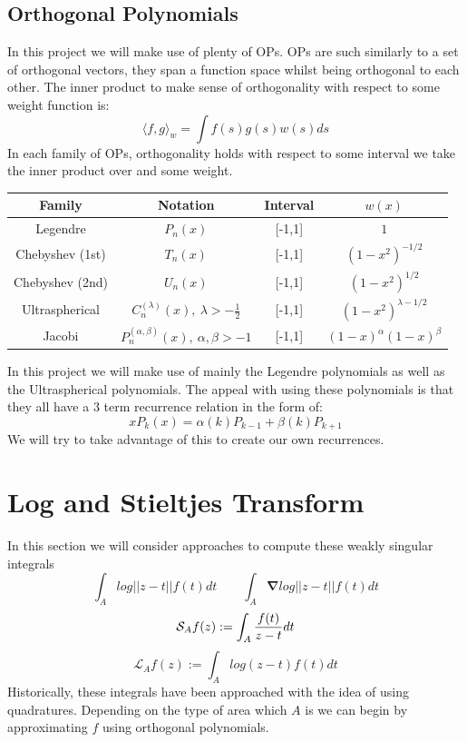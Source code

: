\documentclass{article}
\begin{document}
\subsection{Orthogonal Polynomials}
In this project we will make use of plenty of OPs.
OPs are such similarly to a set of orthogonal vectors, they span a function space whilst being orthogonal to each other.
The inner product to make sense of orthogonality with respect to some weight function is:
$$\langle f,g\rangle_w = \int f(s)g(s)w(s)ds$$
In each family of OPs, orthogonality holds with respect to some interval we take the inner product over and some weight.
\begin{center}
\begin{tabular}{ |c|c|c|c| } 
 \hline
	Family & Notation & Interval & $w(x)$ \\ 
 \hline
	Legendre & $P_n(x)$ & [-1,1] & $1$ \\ 
	Chebyshev (1st) & $T_n(x)$ & [-1,1] & $(1-x^2)^{-1/2}$ \\ 
	Chebyshev (2nd) & $U_n(x)$ & [-1,1] & $(1-x^2)^{1/2}$ \\
	Ultraspherical & $C_n^{(\lambda)}(x),\:\lambda>-\frac{1}{2}$ & [-1,1] & $(1-x^2)^{\lambda-1/2}$ \\
	Jacobi & $P_n^{(\alpha,\beta)}(x),\:\alpha,\beta>-1$ & [-1,1] & $(1-x)^\alpha(1-x)^\beta$ \\
 \hline
\end{tabular}
\end{center}
In this project we will make use of mainly the Legendre polynomials as well as the Ultraspherical polynomials.
The appeal with using these polynomials is that they all have a 3 term recurrence relation in the form of:
$$xP_k(x) = \alpha(k) P_{k-1} + \beta(k) P_{k+1}$$
We will try to take advantage of this to create our own recurrences.
\section{Log and Stieltjes Transform}
In this section we will consider approaches to compute these weakly singular integrals
$$ \int_Alog||z-t||f(t)dt \qquad \int_A\mathbf{\nabla}log||z-t||f(t)dt $$
\begin{equation}\label{stieltjes transform}
	\mathcal{S}_Af(z):= \int_A\frac{f(t)}{z-t}dt \\
\end{equation}
\begin{equation}\label{log transform}
	\mathcal{L}_Af(z):= \int_Alog(z-t)f(t)dt
\end{equation}
Historically, these integrals have been approached with the idea of using quadratures\cite{quadrature,poissonquad}.
Depending on the type of area which $A$ is we can begin by approximating $f$ using orthogonal polynomials.
\end{document}
